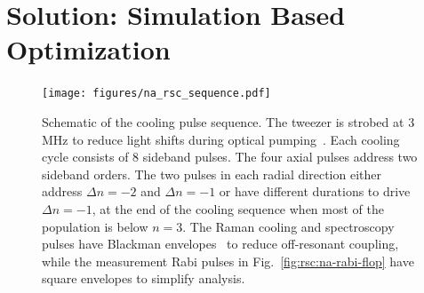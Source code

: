 \section{Solution: Simulation Based Optimization}
\label{ch:rsc:simulation}

\begin{figure}
  \centering
  \texttt{[image: figures/na\_rsc\_sequence.pdf]}
  \caption[Simulation optimized Raman sideband cooling sequence for Sodium]{
    Schematic of the cooling pulse sequence. The tweezer is strobed at 3 MHz to
    reduce light shifts during optical pumping~\cite{hutzler_eliminating_2017}.
    Each cooling cycle consists of $8$ sideband pulses.
    The four axial pulses address two sideband orders.
    The two pulses in each radial direction either address $\Delta n=-2$ and $\Delta n=-1$
    or have different durations to drive $\Delta n=-1$,
    at the end of the cooling sequence when most of the population is below $n=3$.
    The Raman cooling and spectroscopy pulses have Blackman envelopes~\cite{kasevich_laser_1992}
    to reduce off-resonant coupling,
    while the measurement Rabi pulses in Fig.~\ref{fig:rsc:na-rabi-flop}
    have square envelopes to simplify analysis.
    \label{fig:rsc:na-sequence}}
\end{figure}

